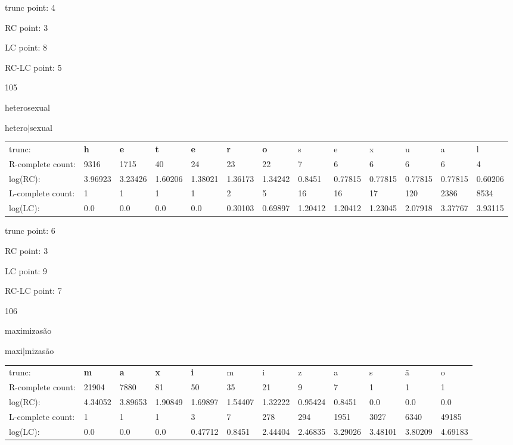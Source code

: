 \documentclass{article}
\begin{document}
trunc point: 4

RC point: 3

LC point: 8

RC-LC point: 5

\vspace{3em}



105

heterosexual

hetero$|$sexual

\vspace{1em}

\begin{tabular}{l|llllllllllll}

trunc: & {\color{red}\bf h} & {\color{red}\bf e} & {\color{red}\bf t} & {\color{red}\bf e} & {\color{red}\bf r} & {\color{red}\bf o} & s & e & x & u & a & l \\ 
R-complete count: & 9316 & 1715 & 40 & 24 & 23 & 22 & 7 & 6 & 6 & 6 & 6 & 4 \\ 
log(RC): & 3.96923 & 3.23426 & 1.60206 & 1.38021 & 1.36173 & 1.34242 & 0.8451 & 0.77815 & 0.77815 & 0.77815 & 0.77815 & 0.60206 \\ 
L-complete count: & 1 & 1 & 1 & 1 & 2 & 5 & 16 & 16 & 17 & 120 & 2386 & 8534 \\ 
log(LC): & 0.0 & 0.0 & 0.0 & 0.0 & 0.30103 & 0.69897 & 1.20412 & 1.20412 & 1.23045 & 2.07918 & 3.37767 & 3.93115 \\ 
\end{tabular}

trunc point: 6

RC point: 3

LC point: 9

RC-LC point: 7

\vspace{3em}



106

maximizasão

maxi$|$mizasão

\vspace{1em}

\begin{tabular}{l|lllllllllll}

trunc: & {\color{red}\bf m} & {\color{red}\bf a} & {\color{red}\bf x} & {\color{red}\bf i} & m & i & z & a & s & ã & o \\ 
R-complete count: & 21904 & 7880 & 81 & 50 & 35 & 21 & 9 & 7 & 1 & 1 & 1 \\ 
log(RC): & 4.34052 & 3.89653 & 1.90849 & 1.69897 & 1.54407 & 1.32222 & 0.95424 & 0.8451 & 0.0 & 0.0 & 0.0 \\ 
L-complete count: & 1 & 1 & 1 & 3 & 7 & 278 & 294 & 1951 & 3027 & 6340 & 49185 \\ 
log(LC): & 0.0 & 0.0 & 0.0 & 0.47712 & 0.8451 & 2.44404 & 2.46835 & 3.29026 & 3.48101 & 3.80209 & 4.69183 \\ 
\end{tabular}
\end{document}
